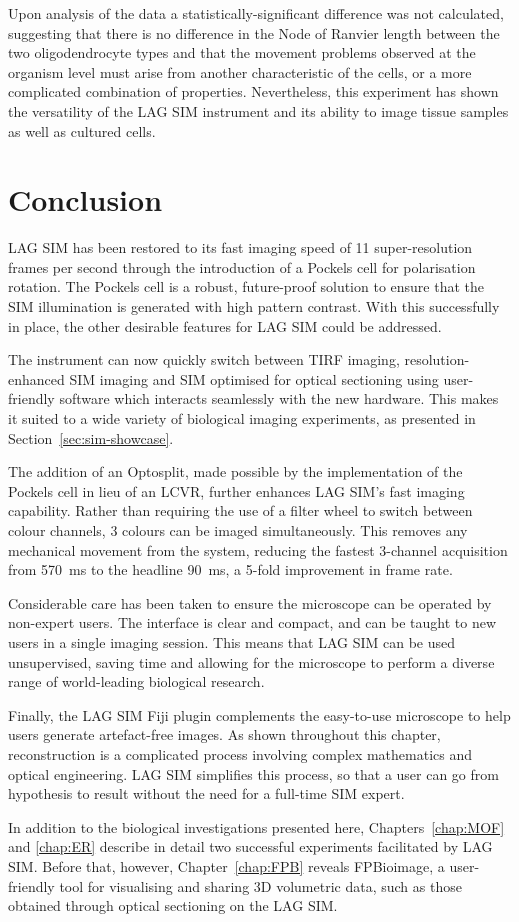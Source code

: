 Upon analysis of the data a statistically-significant difference was not calculated, suggesting that there is no difference in the Node of Ranvier length between the two oligodendrocyte types and that the movement problems observed at the organism level must arise from another characteristic of the cells, or a more complicated combination of properties.
Nevertheless, this experiment has shown the versatility of the LAG SIM instrument and its ability to image tissue samples as well as cultured cells.

\section{Conclusion}
LAG SIM has been restored to its fast imaging speed of 11 super-resolution frames per second through the introduction of a Pockels cell for polarisation rotation.
The Pockels cell is a robust, future-proof solution to ensure that the SIM illumination is generated with high pattern contrast.
With this successfully in place, the other desirable features for LAG SIM could be addressed.

The instrument can now quickly switch between TIRF imaging, resolution-enhanced SIM imaging and SIM optimised for optical sectioning using user-friendly software which interacts seamlessly with the new hardware.
This makes it suited to a wide variety of biological imaging experiments, as presented in Section~\ref{sec:sim-showcase}.

The addition of an Optosplit, made possible by the implementation of the Pockels cell in lieu of an LCVR, further enhances LAG SIM's fast imaging capability.
Rather than requiring the use of a filter wheel to switch between colour channels, 3 colours can be imaged simultaneously.
This removes any mechanical movement from the system, reducing the fastest 3-channel acquisition from \SI{570}{\milli\second} to the headline \SI{90}{\milli\second}, a 5-fold improvement in frame rate.

Considerable care has been taken to ensure the microscope can be operated by non-expert users.
The interface is clear and compact, and can be taught to new users in a single imaging session.
This means that LAG SIM can be used unsupervised, saving time and allowing for the microscope to perform a diverse range of world-leading biological research.

Finally, the LAG SIM Fiji plugin complements the easy-to-use microscope to help users generate artefact-free images.
As shown throughout this chapter, reconstruction is a complicated process involving complex mathematics and optical engineering.
LAG SIM simplifies this process, so that a user can go from hypothesis to result without the need for a full-time SIM expert.

In addition to the biological investigations presented here, Chapters~\ref{chap:MOF} and \ref{chap:ER} describe in detail two successful experiments facilitated by LAG SIM.
Before that, however, Chapter~\ref{chap:FPB} reveals FPBioimage, a user-friendly tool for visualising and sharing 3D volumetric data, such as those obtained through optical sectioning on the LAG SIM.
